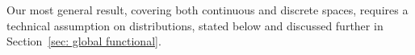 \documentclass[accepted]{article}
\theoremstyle{plain} %
\theoremstyle{definition}
\theoremstyle{remark}
\newcommand{\HG}[1]{\textcolor{cyan}{[#1]}}
\begin{document}
Our most general result, covering both continuous and discrete spaces, requires a technical assumption on distributions, stated below and discussed further in Section~\ref{sec: global functional}.
\end{document}
